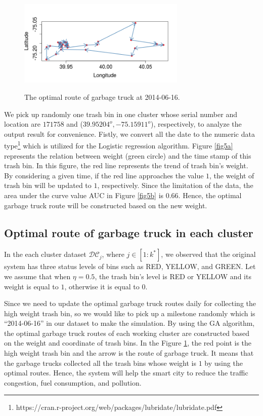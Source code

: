 \documentclass[conference]{IEEEtran}
\begin{document}
\begin{figure}
	
	\begin{minipage}{8cm}
		\includegraphics[width=8cm]{Cluster5}
		\label{fig1b}
	\end{minipage}
	\caption{The optimal route of garbage truck at 2014-06-16.}
	\label{fig5}
	
\end{figure}
We pick up randomly one trash bin in one cluster whose serial number and location are $171758$ and ($39.95204^o,-75.15911^o$), respectively, to analyze the output result for convenience. Fistly, we convert all the date to the numeric data type\footnote{https://cran.r-project.org/web/packages/lubridate/lubridate.pdf} which is utilized for the Logistic regression algorithm. Figure \ref{fig5a} represents the relation between weight (green circle) and the time stamp of this trash bin. In this figure, the red line represents the trend of trash bin's weight. By considering a given time, if the red line approaches the value $1$, the weight of trash bin will be updated to $1$, respectively. Since the limitation of the data, the area under the curve value AUC in Figure \ref{fig5b} is 0.66.  Hence, the optimal garbage truck route will be constructed based on the new weight.


\subsection{Optimal route of garbage truck in each cluster}


In the each cluster dataset $\mathcal{DC}_j$, where $j \in [1:k^*]$, we observed that the original system has three status levels of bins such as RED, YELLOW, and GREEN. Let we assume that when $\eta = 0.5$, the trash bin's level is RED or YELLOW and its weight is equal to $1$, otherwise it is equal to $0$.

\par Since we need to update the optimal garbage truck routes daily for collecting the high weight trash bin, so we would like to pick up a milestone randomly which is ``2014-06-16'' in our dataset to make the simulation. By using the GA algorithm, the optimal garbage truck routes of each working cluster are constructed based on the weight and coordinate of trash bins. In the Figure \ref{fig5}, the red point is the high weight trash bin and the arrow is the route of garbage truck. It means that the garbage trucks collected all the trash bins whose weight is $1$ by using the optimal routes. Hence, the system will help the smart city to reduce the traffic congestion, fuel consumption, and pollution.
\end{document}
